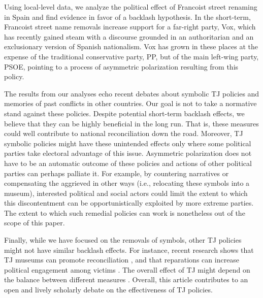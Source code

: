 \documentclass[12pt, titlepage]{article}
\begin{document}

Using local-level data, we analyze the political effect of Francoist street renaming in Spain and find evidence in favor of a backlash hypothesis. In the short-term, Francoist street name removals increase support for a far-right party, Vox, which has recently gained steam with a discourse grounded in an authoritarian and an exclusionary version of Spanish nationalism. Vox has grown in these places at the expense of the traditional conservative party, PP, but of the main left-wing party, PSOE, pointing to a process of asymmetric polarization resulting from this policy.

The results from our analyses echo recent debates about symbolic TJ policies and memories of past conflicts in other countries. Our goal is not to take a normative stand against these policies. Despite potential short-term backlash effects, we believe that they can be highly beneficial in the long run. That is, these measures could well contribute to national reconciliation down the road. Moreover, TJ symbolic policies might have these unintended effects only where some political parties take electoral advantage of this issue. Asymmetric polarization does not have to be an automatic outcome of these policies and actions of other political parties can perhaps palliate it. For example, by countering narratives or compensating the aggrieved in other ways (i.e., relocating these symbols into a museum), interested political and social actors could limit the extent to which this discontentment can be opportunistically exploited by more extreme parties. The extent to which such remedial policies can work is nonetheless out of the scope of this paper. 

Finally, while we have focused on the removals of symbols, other TJ policies might not have similar backlash effects. For instance, recent research shows that TJ museums can promote reconciliation \citep{Balcells:2020aa}, and that reparations can increase political engagement among victims \citep{voytas:2021}. The overall effect of TJ might depend on the balance between different measures \citep{Olsen:2010aa, Loyle:2017aa}.
Overall, this article contributes to an open and lively scholarly debate on the effectiveness of TJ policies.

\end{document}
